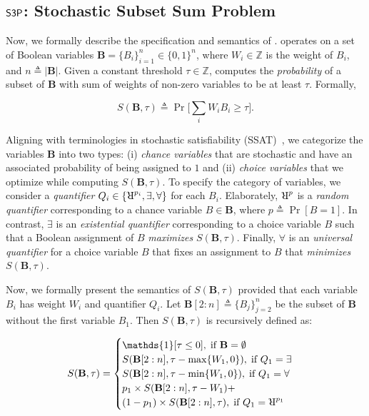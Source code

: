 \subsection{$ \mathsf{S3P} $: Stochastic Subset Sum Problem}\label{fvgm_sec:stochastic_sum_set_sum}
Now, we formally describe the specification and semantics of {\stochastic}.
{\stochastic} operates on  a set of Boolean variables $ \mathbf{B} = \{B_i\}_{i=1}^{n} \in \{0,1\}^{n} $, where $ W_i \in \mathbb{Z} $ is the weight of $ B_i $, and $n \triangleq |\mathbf{B}|$. Given a constant threshold $ \tau \in \mathbb{Z} $, {\stochastic} computes the \textit{probability} of a subset of $ \mathbf{B} $ with sum of weights of non-zero variables to be at least $ \tau $. Formally,

\[S(\mathbf{B}, \tau) \triangleq \Pr\Big[\sum_{i} W_iB_i \ge \tau \Big].\]

Aligning with terminologies in stochastic satisfiability (SSAT)~\cite{littman2001stochastic}, we categorize the variables $ \mathbf{B} $ into two types: (i) \textit{chance variables} that are stochastic and have an associated probability of being assigned to $ 1 $ and (ii) \textit{choice variables} that we  optimize while computing $ S(\mathbf{B}, \tau) $.  To specify the category of variables, we consider a \textit{quantifier} $ Q_i \in \{\R^{p_i}, \exists, \forall\} $ for each $ B_i $. Elaborately, $ \R^{p} $ is a \textit{random quantifier} corresponding to a chance variable $ B \in \mathbf{B} $, where  $ p\triangleq \Pr[B = 1]$. In contrast, $ \exists $ is an \textit{existential quantifier} corresponding to a choice variable $ B $ such that a Boolean assignment of $ B $  \textit{maximizes}  $ S(\mathbf{B}, \tau) $. Finally, $ \forall $ is an \textit{universal quantifier} for a choice variable $ B $ that fixes an assignment to $ B $ that \textit{minimizes} $ S(\mathbf{B}, \tau) $. 
 
Now, we formally present the semantics of $ S(\mathbf{B}, \tau) $ provided that each variable $ B_i $ has weight $ W_i $ and quantifier $ Q_i $. Let  $ \mathbf{B}[2:n] \triangleq \{B_j\}_{j=2}^{n} $ be the subset of $\mathbf{B}$ without the first variable $ B_1 $. Then $ S(\mathbf{B}, \tau) $ is recursively defined as:


\begin{align}\label{fvgm_eq:semantics_recurse}
  S(\mathbf{B},\tau) =
 \begin{cases}
 \mathds{1}[ \tau \le 0 ], \; \text{if } \textbf{B} = \emptyset \\
 S(\mathbf{B}[2:n],\tau - \max\{W_1, 0\}), \; \text{if } Q_1 = \exists\\
 S(\mathbf{B}[2:n],\tau - \min\{W_1, 0\}), \; \text{if } Q_1 = \forall\\
 p_1\times S(\mathbf{B}[2:n],\tau - W_1) +\\ (1-p_1)\times S(\mathbf{B}[2:n],\tau),\; \text{if } Q_1 = \R^{p_1}
 \end{cases}
\end{align} 


